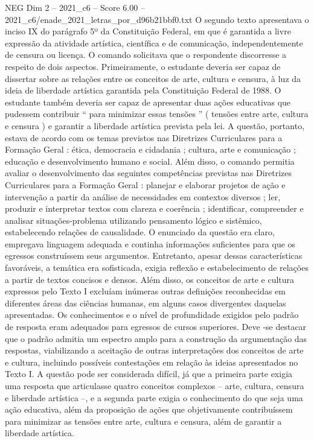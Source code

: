 \begin{textsample}{NEG Dim 2 – 2021\_c6 – Score 6.00 – 2021\_c6/enade\_2021\_letras\_por\_d96b21bbf0.txt}
O segundo texto apresentava o inciso IX do parágrafo 5º da Constituição Federal, em que é garantida a livre expressão da atividade artística, científica e de comunicação, independentemente de censura ou licença.
O comando solicitava que o respondente discorresse a respeito de dois aspectos.
Primeiramente, o estudante deveria ser capaz de dissertar sobre as relações entre os conceitos de arte, cultura e censura, à luz da ideia de liberdade artística garantida pela Constituição Federal de 1988.
O estudante também deveria ser capaz de apresentar duas ações educativas que pudessem contribuir “ para minimizar essas tensões ” ( tensões entre arte, cultura e censura ) e garantir a liberdade artística prevista pela lei.
A questão, portanto, estava de acordo com os temas previstos nas Diretrizes Curriculares para a Formação Geral : ética, democracia e cidadania ; cultura, arte e comunicação ; educação e desenvolvimento humano e social.
Além disso, o comando permitia avaliar o desenvolvimento das seguintes competências previstas nas Diretrizes Curriculares para a Formação Geral : planejar e elaborar projetos de ação e intervenção a partir da análise de necessidades em contextos diversos ; ler, produzir e interpretar textos com clareza e coerência ; identificar, compreender e analisar situações-problema utilizando pensamento lógico e sistêmico, estabelecendo relações de causalidade.
O enunciado da questão era claro, empregava linguagem adequada e continha informações suficientes para que os egressos construíssem seus argumentos.
Entretanto, apesar dessas características favoráveis, a temática era sofisticada, exigia reflexão e estabelecimento de relações a partir de textos concisos e densos.
Além disso, os conceitos de arte e cultura expressos pelo Texto I excluíam inúmeras outras definições reconhecidas em diferentes áreas das ciências humanas, em alguns casos divergentes daquelas apresentadas.
Os conhecimentos e o nível de profundidade exigidos pelo padrão de resposta eram adequados para egressos de cursos superiores.
Deve -se destacar que o padrão admitia um espectro amplo para a construção da argumentação das respostas, viabilizando a aceitação de outras interpretações dos conceitos de arte e cultura, incluindo possíveis contestações em relação às ideias apresentados no Texto I.
A questão pode ser considerada difícil, já que a primeira parte exigia uma resposta que articulasse quatro conceitos complexos – arte, cultura, censura e liberdade artística –, e a segunda parte exigia o conhecimento do que seja uma ação educativa, além da proposição de ações que objetivamente contribuíssem para minimizar as tensões entre arte, cultura e censura, além de garantir a liberdade artística.

\end{textsample}

